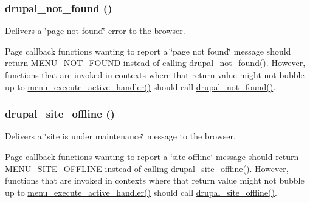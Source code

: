 \hypertarget{group__http__handling_ga52b08cd98e1756326c1bd5b56c39a884}{
\subsubsection[{drupal\_\-not\_\-found}]{\setlength{\rightskip}{0pt plus 5cm}drupal\_\-not\_\-found ()}}
\label{group__http__handling_ga52b08cd98e1756326c1bd5b56c39a884}
Delivers a \char`\"{}page not found\char`\"{} error to the browser.

Page callback functions wanting to report a \char`\"{}page not found\char`\"{} message should return MENU\_\-NOT\_\-FOUND instead of calling \hyperlink{group__http__handling_ga52b08cd98e1756326c1bd5b56c39a884}{drupal\_\-not\_\-found()}. However, functions that are invoked in contexts where that return value might not bubble up to \hyperlink{group__menu_gae33bae24fcac6126aa272d1c437f947c}{menu\_\-execute\_\-active\_\-handler()} should call \hyperlink{group__http__handling_ga52b08cd98e1756326c1bd5b56c39a884}{drupal\_\-not\_\-found()}. \hypertarget{group__http__handling_gafc3a1915f45be2ac8666778eef0e9758}{
\subsubsection[{drupal\_\-site\_\-offline}]{\setlength{\rightskip}{0pt plus 5cm}drupal\_\-site\_\-offline ()}}
\label{group__http__handling_gafc3a1915f45be2ac8666778eef0e9758}
Delivers a \char`\"{}site is under maintenance\char`\"{} message to the browser.

Page callback functions wanting to report a \char`\"{}site offline\char`\"{} message should return MENU\_\-SITE\_\-OFFLINE instead of calling \hyperlink{group__http__handling_gafc3a1915f45be2ac8666778eef0e9758}{drupal\_\-site\_\-offline()}. However, functions that are invoked in contexts where that return value might not bubble up to \hyperlink{group__menu_gae33bae24fcac6126aa272d1c437f947c}{menu\_\-execute\_\-active\_\-handler()} should call \hyperlink{group__http__handling_gafc3a1915f45be2ac8666778eef0e9758}{drupal\_\-site\_\-offline()}. 